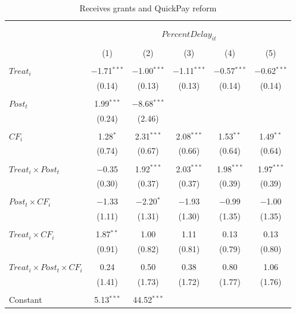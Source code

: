 \documentclass[
]{article}
\begin{document}
\begin{table}[H] \centering 
  \caption{Receives grants and QuickPay reform} 
  \label{} 
\small 
\begin{tabular}{@{\extracolsep{-2pt}}lccccc} 
\\[-1.8ex]\hline 
\hline \\[-1.8ex] 
\\[-1.8ex] & \multicolumn{5}{c}{$PercentDelay_{it}$  } \\ 
\\[-1.8ex] & (1) & (2) & (3) & (4) & (5)\\ 
\hline \\[-1.8ex] 
 $Treat_i$ & $-$1.71$^{***}$ & $-$1.00$^{***}$ & $-$1.11$^{***}$ & $-$0.57$^{***}$ & $-$0.62$^{***}$ \\ 
  & (0.14) & (0.13) & (0.13) & (0.14) & (0.14) \\ 
  & & & & & \\ 
 $Post_t$ & 1.99$^{***}$ & $-$8.68$^{***}$ &  &  &  \\ 
  & (0.24) & (2.46) &  &  &  \\ 
  & & & & & \\ 
 $CF_i$ & 1.28$^{*}$ & 2.31$^{***}$ & 2.08$^{***}$ & 1.53$^{**}$ & 1.49$^{**}$ \\ 
  & (0.74) & (0.67) & (0.66) & (0.64) & (0.64) \\ 
  & & & & & \\ 
 $Treat_i \times Post_t$ & $-$0.35 & 1.92$^{***}$ & 2.03$^{***}$ & 1.98$^{***}$ & 1.97$^{***}$ \\ 
  & (0.30) & (0.37) & (0.37) & (0.39) & (0.39) \\ 
  & & & & & \\ 
 $Post_t \times CF_i$ & $-$1.33 & $-$2.20$^{*}$ & $-$1.93 & $-$0.99 & $-$1.00 \\ 
  & (1.11) & (1.31) & (1.30) & (1.35) & (1.35) \\ 
  & & & & & \\ 
 $Treat_i \times CF_i$ & 1.87$^{**}$ & 1.00 & 1.11 & 0.13 & 0.13 \\ 
  & (0.91) & (0.82) & (0.81) & (0.79) & (0.80) \\ 
  & & & & & \\ 
 $Treat_i \times Post_t \times CF_i$ & 0.24 & 0.50 & 0.38 & 0.80 & 1.06 \\ 
  & (1.41) & (1.73) & (1.72) & (1.77) & (1.76) \\ 
  & & & & & \\ 
 Constant & 5.13$^{***}$ & 44.52$^{***}$ &  &  &  \\ 

\end{tabular}
\end{table}
\end{document}
